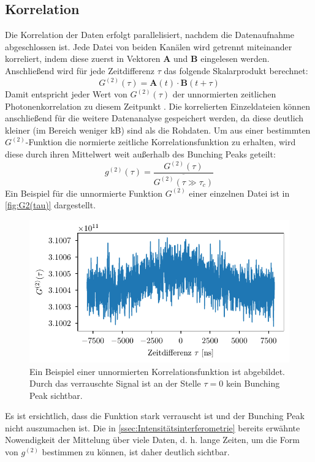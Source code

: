 \subsection{Korrelation}
\label{ssec:Korrelation}
Die Korrelation der Daten erfolgt parallelisiert, nachdem die Datenaufnahme abgeschlossen ist. 
Jede Datei von beiden Kanälen wird getrennt miteinander korreliert, indem diese zuerst in Vektoren $\mathbf{A}$ und $\mathbf{B}$ eingelesen werden. 
Anschließend wird für jede Zeitdifferenz $\tau$ das folgende Skalarprodukt berechnet: 
\begin{equation}
    G^{(2)}(\tau) = \mathbf{A}(t)\cdot\mathbf{B}(t+\tau)
    \label{eq:korrelation}
\end{equation}
Damit entspricht jeder Wert von $G^{(2)}(\tau)$ der unnormierten zeitlichen Photonenkorrelation zu diesem Zeitpunkt \cite{zmijaOpticalIntensityInterferometry2021}. 
Die korrelierten Einzeldateien können anschließend für die weitere Datenanalyse gespeichert werden, da diese deutlich kleiner (im Bereich weniger kB) sind als die Rohdaten. 
Um aus einer bestimmten $G^{(2)}$-Funktion die normierte zeitliche Korrelationsfunktion zu erhalten, wird diese durch ihren Mittelwert weit außerhalb des Bunching Peaks geteilt:
\begin{equation}
    g^{(2)}(\tau) = \frac{G^{(2)}(\tau)}{\overline{G^{(2)}(\tau\gg\tau_c)}}
    \label{eq:G2 normalisierung}
\end{equation}
Ein Beispiel für die unnormierte Funktion $G^{(2)}$ einer einzelnen Datei ist in \autoref{fig:G2(tau)} dargestellt. 
\begin{figure}[h]
    \centering
    \includegraphics{images/Datenaufnahme/G2.pdf}
    \caption{Ein Beispiel einer unnormierten Korrelationsfunktion ist abgebildet. Durch das verrauschte Signal ist an der Stelle $\tau=0$ kein Bunching Peak sichtbar.}
    \label{fig:G2(tau)}
\end{figure}
Es ist ersichtlich, dass die Funktion stark verrauscht ist und der Bunching Peak nicht auszumachen ist. 
Die in \autoref{ssec:Intensitätsinterferometrie} bereits erwähnte Nowendigkeit der Mittelung über viele Daten, d. h. lange Zeiten, um die Form von $g^{(2)}$ bestimmen zu können, ist daher deutlich sichtbar. 

